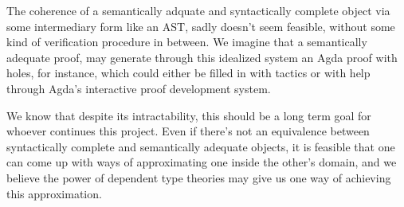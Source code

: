 The coherence of a semantically adquate and syntactically complete object
via some intermediary form like an AST, sadly doesn't seem feasible, without
some kind of verification procedure in between. We imagine that a semantically
adequate proof, may generate through this idealized system an Agda proof with
holes, for instance, which could either be filled in with tactics or with help
through Agda's interactive proof development system.

We know that despite its intractability, this should be a long term goal for
whoever continues this project. Even if there's not an equivalence between
syntactically complete and semantically adequate objects, it is feasible that
one can come up with ways of approximating one inside the other's domain, and we
believe the power of dependent type theories may give us one way of achieving
this approximation.


